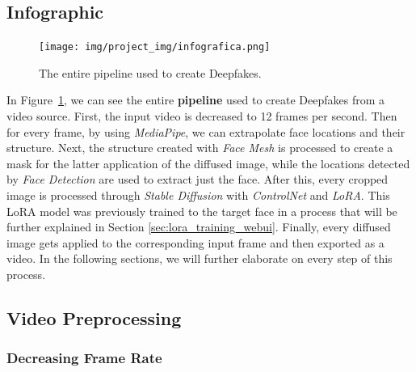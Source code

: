 \documentclass[preprint]{elsarticle}
\begin{document}
\subsection{Infographic} \label{sec:project_info}

\begin{figure}[H]
	\centering
	\texttt{[image: img/project\_img/infografica.png]}
	\caption{The entire pipeline used to create Deepfakes.}
	\label{fig:project}
\end{figure}

In Figure~\ref{fig:project}, we can see the entire \textbf{pipeline} used to create Deepfakes from a video source. 
First, the input video is decreased to 12 frames per second. 
Then for every frame, by using \emph{MediaPipe}, we can extrapolate face locations and their structure. 
Next, the structure created with \emph{Face Mesh} is processed to create a mask for the latter application of the diffused image, 
while the locations detected by \emph{Face Detection} are used to extract just the face.
After this, every cropped image is processed through \emph{Stable Diffusion} with \emph{ControlNet} and \emph{LoRA}. 
This LoRA model was previously trained to the target face in a process that will be further explained in Section \ref{sec:lora_training_webui}. 
Finally, every diffused image gets applied to the corresponding input frame and then exported as a video. 
In the following sections, we will further elaborate on every step of this process. 

\subsection{Video Preprocessing} \label{sec:video_preprocessing}


\subsubsection{Decreasing Frame Rate} \label{sec:decreasing_frame_rate}
\end{document}
